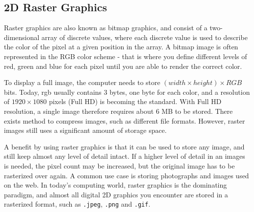 \subsection{2D Raster Graphics}
Raster graphics are also known as bitmap graphics, and consist of a two-dimensional array of discrete values, where each discrete value is used to describe the color of the pixel at a given position in the array.
A bitmap image is often represented in the RGB color scheme - that is where you define different levels of red, green and blue for each pixel until you are able to render the correct color.

To display a full image, the computer needs to store \( (width \times height) \times RGB \) bits.
Today, \gls{rgb} usually contains 3 bytes, one byte for each color, and a resolution of \(1920 \times 1080\) pixels (Full HD) is becoming the standard.
With Full HD resolution, a single image therefore requires about 6 MB to be stored.
There exists method to compress images, such as different file formats.
However, raster images still uses a significant amount of storage space.

A benefit by using raster graphics is that it can be used to store any image, and still keep almost any level of detail intact.
If a higher level of detail in an images is needed, the pixel count may be increased, but the original image has to be rasterized over again.
A common use case is storing photographs and images used on the web.
In today's computing world, raster graphics is the dominating paradigm, and almost all digital 2D graphics you encounter are stored in a rasterized format, such as \texttt{.jpeg}, \texttt{.png} and \texttt{.gif}.
